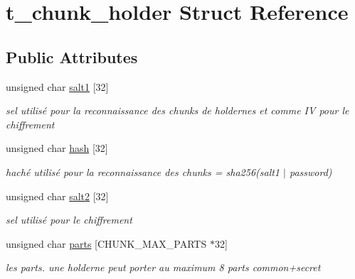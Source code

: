 \hypertarget{structt__chunk__holder}{}\section{t\+\_\+chunk\+\_\+holder Struct Reference}
\label{structt__chunk__holder}
\subsection*{Public Attributes}
\begin{DoxyCompactItemize}
\item 
\mbox{\label{structt__chunk__holder_ad2eb3bcc2105d129b7a47d327f691aaf}} 
unsigned char \hyperlink{structt__chunk__holder_ad2eb3bcc2105d129b7a47d327f691aaf}{salt1} \mbox{[}32\mbox{]}
\begin{DoxyCompactList}\small\item\em sel utilisé pour la reconnaissance des chunks de holdernes et comme IV pour le chiffrement \end{DoxyCompactList}\item 
\mbox{\label{structt__chunk__holder_a7267971f6a35d0116211e9d4ccafbbe3}} 
unsigned char \hyperlink{structt__chunk__holder_a7267971f6a35d0116211e9d4ccafbbe3}{hash} \mbox{[}32\mbox{]}
\begin{DoxyCompactList}\small\item\em haché utilisé pour la reconnaissance des chunks = sha256(salt1 $\vert$ password) \end{DoxyCompactList}\item 
\mbox{\label{structt__chunk__holder_ac7ad26ef12f2f6d03d160dd5cf65e420}} 
unsigned char \hyperlink{structt__chunk__holder_ac7ad26ef12f2f6d03d160dd5cf65e420}{salt2} \mbox{[}32\mbox{]}
\begin{DoxyCompactList}\small\item\em sel utilisé pour le chiffrement \end{DoxyCompactList}\item 
unsigned char \hyperlink{structt__chunk__holder_a170edbd4bb9ca9c4f3e87a8272e6f0df}{parts} \mbox{[}C\+H\+U\+N\+K\+\_\+\+M\+A\+X\+\_\+\+P\+A\+R\+TS $\ast$32\mbox{]}
\begin{DoxyCompactList}\small\item\em les parts. une holderne peut porter au maximum 8 parts common+secret \end{DoxyCompactList}\item 

\end{DoxyCompactItemize}
